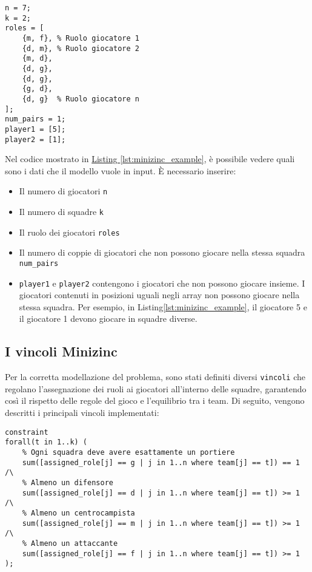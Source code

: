 \documentclass{article}
\begin{document}
\begin{multicols*}{2}
\begin{lstlisting}[style=minizinc, caption={Esempio di input MiniZinc}, label={lst:minizinc_example}]
n = 7;
k = 2;
roles = [
    {m, f}, % Ruolo giocatore 1
    {d, m}, % Ruolo giocatore 2
    {m, d},
    {d, g},
    {d, g},
    {g, d},
    {d, g}  % Ruolo giocatore n
];
num_pairs = 1;
player1 = [5];
player2 = [1];
\end{lstlisting}
Nel codice mostrato in \href{#lst:minizinc_example}{Listing \ref{lst:minizinc_example}}, 
è possibile vedere quali sono i dati che il modello vuole in input. È necessario inserire:
\begin{itemize}
    \item Il numero di giocatori \texttt{n}
    \item Il numero di squadre \texttt{k}
    \item Il ruolo dei giocatori \texttt{roles}
    \item Il numero di coppie di giocatori che non possono giocare nella stessa squadra \texttt{num\_pairs}
    \item \texttt{player1} e \texttt{player2} contengono i giocatori che non possono giocare insieme. I giocatori contenuti in posizioni uguali negli array non possono giocare nella stessa squadra. Per esempio, in {Listing\ref{lst:minizinc_example}}, il giocatore 5 e il giocatore 1 devono giocare in squadre diverse.
\end{itemize}

\subsection{I vincoli Minizinc}
Per la corretta modellazione del problema, 
sono stati definiti diversi \texttt{vincoli} che regolano l'assegnazione dei ruoli ai giocatori all'interno delle squadre, 
garantendo così il rispetto delle regole del gioco e l'equilibrio tra i team. Di seguito, vengono descritti i principali vincoli implementati:

\begin{lstlisting}[style=minizinc, caption={Vincolo 1 Minizinc}, label={lst:minizinc_vincolo}]
constraint
forall(t in 1..k) (
    % Ogni squadra deve avere esattamente un portiere
    sum([assigned_role[j] == g | j in 1..n where team[j] == t]) == 1 /\
    % Almeno un difensore
    sum([assigned_role[j] == d | j in 1..n where team[j] == t]) >= 1 /\
    % Almeno un centrocampista
    sum([assigned_role[j] == m | j in 1..n where team[j] == t]) >= 1 /\
    % Almeno un attaccante
    sum([assigned_role[j] == f | j in 1..n where team[j] == t]) >= 1
);
\end{lstlisting}


\end{multicols*}
\end{document}
